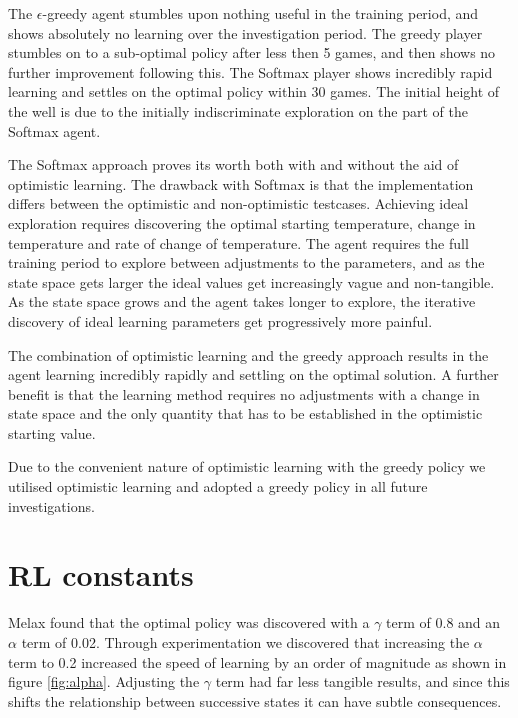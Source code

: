 \documentclass{rucsthesis}
\begin{document}
The $\epsilon$-greedy agent stumbles upon nothing useful in the training period, and shows absolutely no learning over the investigation period. The greedy player stumbles on to a sub-optimal policy after less then 5 games, and then shows no further improvement following this. The Softmax player shows incredibly rapid learning and settles on the optimal policy within 30 games. The initial height of the well is due to the initially indiscriminate exploration on the part of the Softmax agent.

The Softmax approach proves its worth both with and without the aid of optimistic learning. The drawback with Softmax is that the implementation differs between the optimistic and non-optimistic testcases. Achieving ideal exploration requires discovering the optimal starting temperature, change in temperature and rate of change of temperature. The agent requires the full training period to explore between adjustments to the parameters, and as the state space gets larger the ideal values get increasingly vague and non-tangible. As the state space grows and the agent takes longer to explore, the iterative discovery of ideal learning parameters get progressively more painful.

The combination of optimistic learning and the greedy approach results in the agent learning incredibly rapidly and settling on the optimal solution. A further benefit is that the learning method requires no adjustments with a change in state space and the only quantity that has to be established in the optimistic starting value.

Due to the convenient nature of optimistic learning with the greedy policy we utilised optimistic learning and adopted a greedy policy in all future investigations.

\section{RL constants}

Melax found that the optimal policy was discovered with a $\gamma$ term of 0.8 and an $\alpha$ term of 0.02. Through experimentation we discovered that increasing the $\alpha$ term to 0.2 increased the speed of learning by an order of magnitude as shown in figure \ref{fig:alpha}. Adjusting the $\gamma$ term had far less tangible results, and since this shifts the relationship between successive states it can have subtle consequences.
\end{document}
